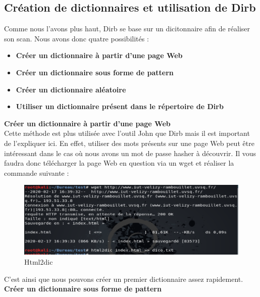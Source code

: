 \subsection{Création de dictionnaires et utilisation de Dirb}

Comme nous l'avons plus haut, Dirb se base sur un dicitonnaire afin de réaliser son scan. Nous avons donc quatre possibilités :

\begin{itemize}
    \item \textbf{Créer un dictionnaire à partir d'une page Web}
    \item \textbf{Créer un dictionnaire sous forme de pattern}
    \item \textbf{Créer un dictionnaire aléatoire}
    \item \textbf{Utiliser un dictionnaire présent dans le répertoire de Dirb}\\
\end{itemize}

 \textbf{Créer un dictionnaire à partir d'une page Web}\\

Cette méthode est plus utilisée avec l'outil John que Dirb mais il est important de l'expliquer ici. En effet, utiliser des mots présents sur une page Web peut être intéressant dans le cas où nous avons un mot de passe hasher à découvrir. Il vous faudra donc télécharger la page Web en question via un wget et réaliser la commande suivante :

\begin{figure}[htp!]
  \centering
  \setlength\figureheight{7cm}
  \setlength\figurewidth{9cm}
  \includegraphics[width=1\textwidth]{oui/images/Dirb/html2dic.PNG}
  \caption{Html2dic}
  \label{fig:courbe-tikz}
\end{figure}

\newpage
C'est ainsi que nous pouvons créer un premier dictionnaire assez rapidement.\\

 \textbf{Créer un dictionnaire sous forme de pattern}\\

